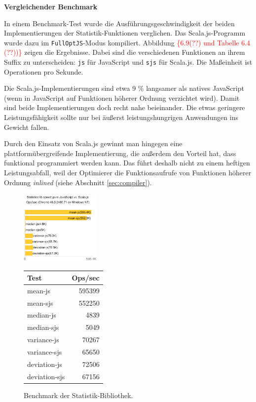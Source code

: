 \documentclass[a4paper, 12pt, hidelinks, listof=totoc, listoftables=totoc, bibliography=totoc]{scrreprt}
\newcommand{\code}[1]{\lstinline[language=Scala, style=inline]|#1|}
\newcommand{\TODOi}[1]{\textcolor{red}{\{#1\}}}
\newcommand{\MyMiniSec}[1]{\rmfamily\fontsize{12}{15}\selectfont
	\vspace{7pt}\textbf{#1} %
}
\begin{document}
\MyMiniSec{Vergleichender Benchmark}

In einem Benchmark-Test wurde die Ausführungsgeschwindigkeit der beiden Implementierungen der Statistik-Funktionen verglichen. Das Scala.js-Programm wurde dazu im \code{FullOptJS}-Modus kompiliert. Abbildung \TODOi{6.9(??) und Tabelle 6.4 (??))} zeigen die Ergebnisse. Dabei sind die verschiedenen Funktionen an ihrem Suffix zu unterscheiden: \code{js} für JavaScript und \code{sjs} für Scala.js. Die Maßeinheit ist Operationen pro Sekunde.

Die Scala.js-Implementierungen sind etwa 9 \% langsamer als natives JavaScript (wenn in JavaScript auf Funktionen höherer Ordnung verzichtet wird). Damit sind beide Implementierungen doch recht nahe beieinander. Die etwas geringere Leistungsfähigkeit sollte nur bei äußerst leistungshungrigen Anwendungen ins Gewicht fallen.

Durch den Einsatz von Scala.js gewinnt man hingegen eine plattformübergreifende Implementierung, die außerdem den Vorteil hat, dass funktional programmiert werden kann. Das führt deshalb nicht zu einem heftigen Leistungsabfall, weil der Optimierer die Funktionsaufrufe von Funktionen höherer Ordnung \emph{inlined} (siehe Abschnitt \ref{sec:compiler}).

\begin{figure}[!h]
	\centering
	\includegraphics[width=0.35\textwidth]{statistics-lib/benchmark-statistics-lib-chart}
	\qquad
	\qquad
	\begin{tabular}[b]{|l|r|}
		\hline \textbf{Test} & \textbf{Ops/sec} \\ 
		\hline mean-js       & 595399 \\ 
		\hline mean-sjs      & 552250 \\ 
		\hline median-js     & 4839 \\ 
		\hline median-sjs    & 5049 \\ 
		\hline variance-js   & 70267 \\ 
		\hline variance-sjs  & 65650 \\ 
		\hline deviation-js  & 72506 \\ 
		\hline deviation-sjs & 67156 \\ 
		\hline 
	\end{tabular}
	\captionsetup{labelformat=andtable}
	\caption{Benchmark der Statistik-Bibliothek.}
\end{figure}
\end{document}
